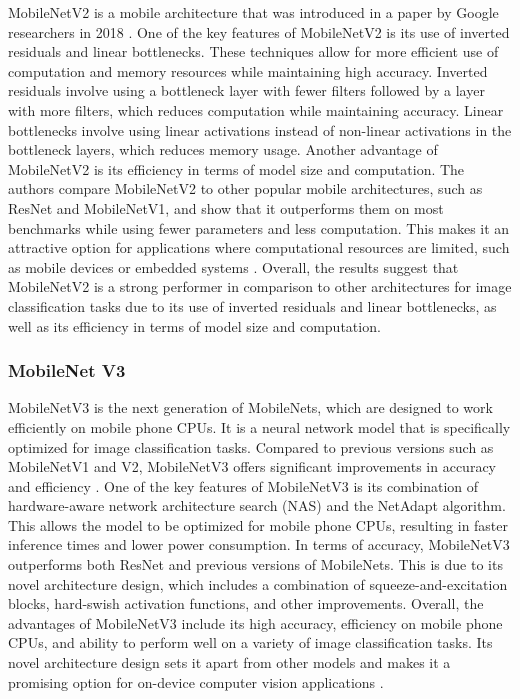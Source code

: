 MobileNetV2 is a mobile architecture that was introduced in a paper by Google researchers in 2018 \cite{sandler2018mobilenetv2}. One of the key features of MobileNetV2 is its use of inverted residuals and linear bottlenecks. These techniques allow for more efficient use of computation and memory resources while maintaining high accuracy. Inverted residuals involve using a bottleneck layer with fewer filters followed by a layer with more filters, which reduces computation while maintaining accuracy. Linear bottlenecks involve using linear activations instead of non-linear activations in the bottleneck layers, which reduces memory usage.  Another advantage of MobileNetV2 is its efficiency in terms of model size and computation. The authors compare MobileNetV2 to other popular mobile architectures, such as ResNet and MobileNetV1, and show that it outperforms them on most benchmarks while using fewer parameters and less computation. This makes it an attractive option for applications where computational resources are limited, such as mobile devices or embedded systems \cite{sandler2018mobilenetv2}.  Overall, the results suggest that MobileNetV2 is a strong performer in comparison to other architectures for image classification tasks due to its use of inverted residuals and linear bottlenecks, as well as its efficiency in terms of model size and computation.


\subsubsection{MobileNet V3}

MobileNetV3 is the next generation of MobileNets, which are designed to work efficiently on mobile phone CPUs. It is a neural network model that is specifically optimized for image classification tasks. Compared to previous versions such as MobileNetV1 and V2, MobileNetV3 offers significant improvements in accuracy and efficiency \cite{howard2019searching}. One of the key features of MobileNetV3 is its combination of hardware-aware network architecture search (NAS) and the NetAdapt algorithm. This allows the model to be optimized for mobile phone CPUs, resulting in faster inference times and lower power consumption. In terms of accuracy, MobileNetV3 outperforms both ResNet and previous versions of MobileNets. This is due to its novel architecture design, which includes a combination of squeeze-and-excitation blocks, hard-swish activation functions, and other improvements. Overall, the advantages of MobileNetV3 include its high accuracy, efficiency on mobile phone CPUs, and ability to perform well on a variety of image classification tasks. Its novel architecture design sets it apart from other models and makes it a promising option for on-device computer vision applications \cite{howard2019searching}.

